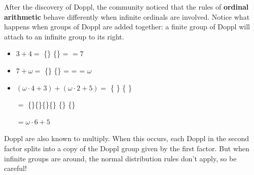 \newpage

After the discovery of Doppl, the \mappMobimon{} community noticed that
the rules of \textbf{ordinal arithmetic} behave differently when infinite
ordinals are involved. Notice what happens when groups of Doppl are added
together: a finite group of Doppl will attach to an infinite group to its
right.

\begin{itemize}
\item \(3+4=\) \{\mappDoppl\mappDoppl\mappDoppl\}%
\{\mappDoppl\mappDoppl\mappDoppl\mappDoppl\} =
\mappDoppl\mappDoppl\mappDoppl\mappDoppl\mappDoppl\mappDoppl\mappDoppl{}
\(=7\)

\item \(7+\omega=\)
\{\mappDoppl\mappDoppl\mappDoppl\mappDoppl\mappDoppl\mappDoppl\mappDoppl\}%
\{\mappDopplOmega\} =
\mappDoppl\mappDoppl\mappDoppl\mappDoppl\mappDoppl\mappDoppl\mappDoppl%
\mappDopplOmega =
\mappDopplOmega{} =
\(\omega\)

\item \((\omega\cdot4+3)+(\omega\cdot2+5)=\)
\{\mappDopplOmega\mappDopplOmega\mappDopplOmega\mappDopplOmega\mappDoppl
\mappDoppl\mappDoppl\}%
\{\mappDopplOmega\mappDopplOmega\mappDoppl\mappDoppl\mappDoppl\mappDoppl
\mappDoppl\}

\hspace{1.55in} \(=\)
\{\mappDopplOmega\}\{\mappDopplOmega\}\{\mappDopplOmega\}\{\mappDopplOmega\}%
\{\mappDoppl\mappDoppl\mappDoppl\mappDopplOmega\}%
\{\mappDopplOmega\}\mappDoppl\mappDoppl\mappDoppl\mappDoppl\mappDoppl{}

\hspace{1.55in} \(=\omega\cdot6+5\)
\end{itemize}

Doppl are also known to multiply. When this occurs, each Doppl in the second
factor splits into a copy of the Doppl group given by the first factor.
But when infinite groups are around, the normal distribution rules don't apply,
so be careful!

